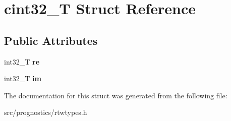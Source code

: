 \hypertarget{structcint32__T}{}\section{cint32\+\_\+T Struct Reference}
\label{structcint32__T}
\subsection*{Public Attributes}
\begin{DoxyCompactItemize}
\item 
\mbox{\label{structcint32__T_a735a454963f0e5d282a5b61740977e90}} 
int32\+\_\+T {\bfseries re}
\item 
\mbox{\label{structcint32__T_af0bd7d093eea1fff36c3210ee4c5abe4}} 
int32\+\_\+T {\bfseries im}
\end{DoxyCompactItemize}


The documentation for this struct was generated from the following file\+:\begin{DoxyCompactItemize}
\item 
src/prognostics/rtwtypes.\+h\end{DoxyCompactItemize}
